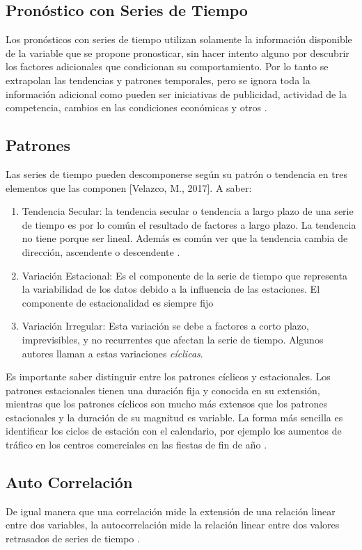 \subsection{Pronóstico con Series de Tiempo}
Los pronósticos con series de tiempo utilizan solamente la información disponible de la variable que se propone pronosticar, sin hacer intento alguno por descubrir los factores adicionales que condicionan su comportamiento. Por lo tanto se extrapolan las tendencias y patrones temporales, pero se ignora toda la información adicional como pueden ser iniciativas de publicidad, actividad de la competencia, cambios en las condiciones económicas y otros \cite{hyndman}.

\subsection{Patrones}
Las series de tiempo pueden descomponerse según su patrón o tendencia en tres elementos que las componen [Velazco, M., 2017]. A saber:

\begin{enumerate}
	\item Tendencia Secular: la tendencia secular o tendencia a largo plazo de una serie de tiempo es por lo común el resultado de factores a largo plazo. La tendencia no tiene porque ser lineal. Además es común ver que la tendencia cambia de dirección, ascendente o descendente \cite{hyndman}.
	\item Variación Estacional: Es el componente de la serie de tiempo que representa la variabilidad de los datos debido a la influencia de las estaciones. El componente de estacionalidad es siempre fijo \cite{hyndman}
	\item Variación Irregular: Esta variación se debe a factores a corto plazo, imprevisibles, y no recurrentes que afectan la serie de tiempo. Algunos autores llaman a estas variaciones \emph{cíclicas}.
\end{enumerate}

Es importante saber distinguir entre los patrones cíclicos y estacionales. Los patrones estacionales tienen una duración fija y conocida en su extensión, mientras que los patrones cíclicos son mucho más extensos que los patrones estacionales y la duración de su magnitud es variable. La forma más sencilla es identificar los ciclos de estación con el calendario, por ejemplo los aumentos de tráfico en los centros comerciales en las fiestas de fin de año \cite{hyndman}.

\subsection{Auto Correlación}
De igual manera que una correlación mide la extensión de una relación linear entre dos variables, la autocorrelación mide la relación linear entre dos valores retrasados de series de tiempo \cite{hyndman}.

